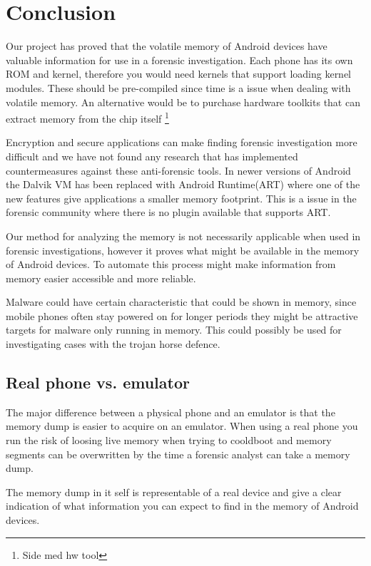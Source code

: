 \section{Conclusion}
Our project has proved that the volatile memory of Android devices have valuable information for use 
in a forensic investigation. %
Each phone has its own ROM and kernel, therefore you would need kernels that support loading kernel 
modules. These should be pre-compiled since time is a issue when dealing with volatile memory. An 
alternative would be to purchase hardware toolkits that can extract memory from the chip itself 
\footnote{Side med hw tool} %

Encryption and secure applications can make finding forensic investigation more difficult and we have not found 
any research that has implemented countermeasures against these anti-forensic tools. In newer versions 
of Android the Dalvik VM has been replaced with Android Runtime(ART) where one of the new 
features give applications a smaller memory footprint. This is a issue in the forensic community where there is no 
plugin available that supports ART.

Our method for analyzing the memory is not necessarily applicable when used in forensic investigations, 
however it proves what might be available in the memory of Android devices. 
To automate this process might make information from memory easier accessible and more reliable.

Malware could have certain characteristic that could be shown in memory, since mobile phones often stay 
powered on for longer periods they might be attractive targets for malware only running in memory. 
This could possibly be used for investigating cases with the trojan horse defence.

\subsection{Real phone vs. emulator}
The major difference between a physical phone and an emulator is that the memory dump is easier to acquire on an emulator. When using a real phone you run the risk of loosing live memory when trying to cooldboot and 
memory segments can be overwritten by the time a forensic analyst can take a memory dump.

The memory dump in it self is representable of a real device and give a clear indication of what 
information you can expect to find in the memory of Android devices.




